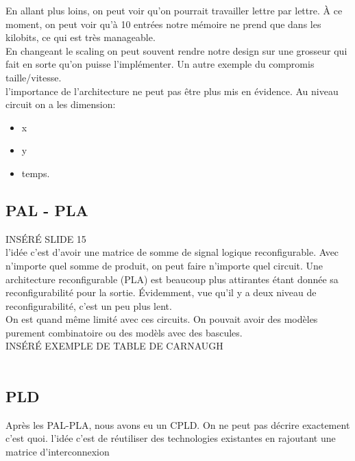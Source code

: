 \documentclass[oneside]{book}
\begin{document}
        En allant plus loins, on peut voir qu'on pourrait travailler lettre par lettre. À ce moment, on peut voir qu'à 10 entrées notre mémoire ne prend que dans les kilobits, ce qui est très manageable.\\
        
        En changeant le scaling on peut souvent rendre notre design sur une grosseur qui fait en sorte qu'on puisse l'implémenter. Un autre exemple du compromis taille/vitesse.\\
        
        l'importance de l'architecture ne peut pas être plus mis en évidence. Au niveau circuit on a les dimension:
        \begin{itemize}
            \item x
            \item y
            \item temps.
        \end{itemize}
    
        \subsection{PAL - PLA}
        INSÉRÉ SLIDE 15\\
        
        l'idée c'est d'avoir une matrice de somme de signal logique reconfigurable. Avec n'importe quel somme de produit, on peut faire n'importe quel circuit. Une architecture reconfigurable (PLA) est beaucoup plus attirantes étant donnée sa reconfigurabilité pour la sortie. Évidemment, vue qu'il y a deux niveau de reconfigurabilité, c'est un peu plus lent.\\
        
        On est quand même limité avec ces circuits. On pouvait avoir des modèles purement combinatoire ou des modèls avec des bascules.\\
        
        INSÉRÉ EXEMPLE DE TABLE DE CARNAUGH\\
        \\
        \subsection{PLD}
        Après les PAL-PLA, nous avons eu un CPLD. On ne peut pas décrire exactement c'est quoi. l'idée c'est de réutiliser des technologies existantes en rajoutant une matrice d'interconnexion\\
        
\end{document}
